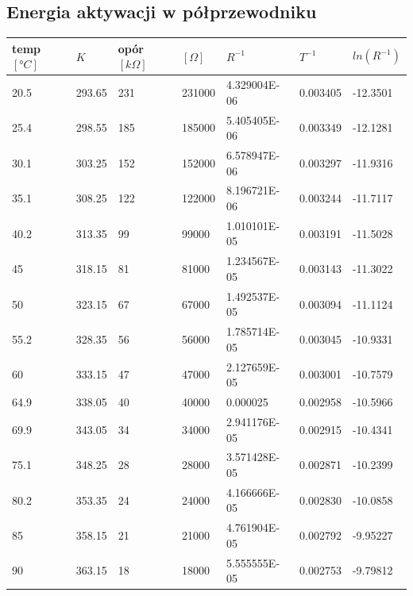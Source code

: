 \documentclass[a4paper, 11pt]{article}
\begin{document}
\subsection{Energia aktywacji w półprzewodniku}\label{sub:} %
\begin{center}

	\begin{tabular}{|l|l|l|l|l|l|l|}
		\hline
		temp $[°C]$ & $K$    & opór $[k\Omega]$ & $[\Omega]$ & $R^{-1}$     & $T^{-1}$ & $ln(R^{-1})$ \\ \hline
		20.5        & 293.65 & 231              & 231000     & 4.329004E-06 & 0.003405 & -12.3501     \\ \hline
		25.4        & 298.55 & 185              & 185000     & 5.405405E-06 & 0.003349 & -12.1281     \\ \hline
		30.1        & 303.25 & 152              & 152000     & 6.578947E-06 & 0.003297 & -11.9316     \\ \hline
		35.1        & 308.25 & 122              & 122000     & 8.196721E-06 & 0.003244 & -11.7117     \\ \hline
		40.2        & 313.35 & 99               & 99000      & 1.010101E-05 & 0.003191 & -11.5028     \\ \hline
		45          & 318.15 & 81               & 81000      & 1.234567E-05 & 0.003143 & -11.3022     \\ \hline
		50          & 323.15 & 67               & 67000      & 1.492537E-05 & 0.003094 & -11.1124     \\ \hline
		55.2        & 328.35 & 56               & 56000      & 1.785714E-05 & 0.003045 & -10.9331     \\ \hline
		60          & 333.15 & 47               & 47000      & 2.127659E-05 & 0.003001 & -10.7579     \\ \hline
		64.9        & 338.05 & 40               & 40000      & 0.000025     & 0.002958 & -10.5966     \\ \hline
		69.9        & 343.05 & 34               & 34000      & 2.941176E-05 & 0.002915 & -10.4341     \\ \hline
		75.1        & 348.25 & 28               & 28000      & 3.571428E-05 & 0.002871 & -10.2399     \\ \hline
		80.2        & 353.35 & 24               & 24000      & 4.166666E-05 & 0.002830 & -10.0858     \\ \hline
		85          & 358.15 & 21               & 21000      & 4.761904E-05 & 0.002792 & -9.95227     \\ \hline
		90          & 363.15 & 18               & 18000      & 5.555555E-05 & 0.002753 & -9.79812     \\ \hline
	\end{tabular}


\end{center}
\end{document}
